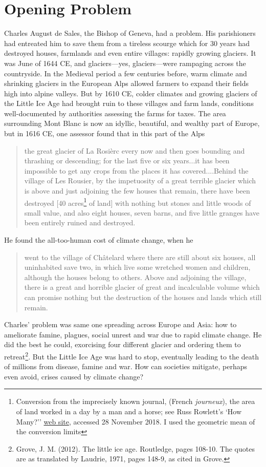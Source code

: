 \section{Opening Problem} \label{Ice_Ages_Opening Problem}
Charles August de Sales, the Bishop of Geneva, had a problem. His parishioners had entreated him to save them from a tireless scourge which for 30 years had destroyed houses, farmlands and even entire villages: rapidly growing glaciers. It was June of 1644 CE, and glaciers---yes, glaciers---were rampaging across the countryside. In the Medieval period a few centuries before, warm climate and shrinking glaciers in the European Alps allowed farmers to expand their fields high into alpine valleys. But by 1610 CE, colder climates and growing glaciers of the Little Ice Age had brought ruin to these villages and farm lands, conditions well-documented by authorities assessing the farms for taxes. The area surrounding Mont Blanc is now an idyllic, beautiful, and wealthy part of Europe, but in 1616 CE, one assessor found that in this part of the Alps 
\begin{quote}
the great glacier of La Rosi\`erc every now and then goes bounding and thrashing or descending; for the last five or six years...it has been impossible to get any crops from the places it has covered....Behind the village of Les Rousier, by the impetuosity of a great terrible glacier which is above and just adjoining the few houses that remain, there have been destroyed [40 acres\footnote{Conversion from the imprecisely known journal, (French \textit{journeux}), the area of land worked in a day by a man and a horse; see Russ Rowlett's `How Many?'' \href{http://www.ibiblio.org/units/dictJ.html}{web site}, accessed 28 November 2018. I used the geometric mean of the conversion limits} of land] with nothing but stones and little woods of small value, and also eight houses, seven barns, and five little granges have been entirely ruined and destroyed.
\end{quote}
He found the all-too-human cost of climate change, when he
\begin{quote} 
went to the village of Ch\^atelard where there are still about six houses, all uninhabited save two, in which live some wretched women and children, although the houses belong to others. Above and adjoining the village, there is a great and horrible glacier of great and incalculable volume which can promise nothing but the destruction of the houses and lands which still remain.
\end{quote}
Charles' problem was same one spreading across Europe and Asia: how to ameliorate famine, plagues, social unrest and war due to rapid climate change. He did the best he could, exorcising four different glacier and ordering them to retreat\footnote{Grove, J. M. (2012). The little ice age. Routledge, pages 108-10. The quotes are as translated by Laudrie, 1971, pages 148-9, as cited in Grove.}. But the Little Ice Age was hard to stop, eventually leading to the death of millions from disease, famine and war. How can societies mitigate, perhaps even avoid, crises caused by climate change?


